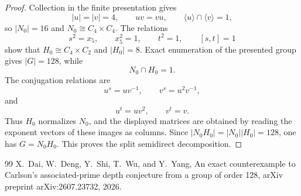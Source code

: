 \documentclass[10pt,a4paper]{amsart}
\begin{document}
\begin{proof}
Collection in the finite presentation gives
\[
|u|=|v|=4,
\qquad uv=vu,
\qquad \langle u\rangle\cap\langle v\rangle=1,
\]
so \(|N_0|=16\) and \(N_0\cong C_4\times C_4\).  The relations
\[
s^2=x_5,\qquad x_5^2=1,
\qquad t^2=1,
\qquad [s,t]=1
\]
show that \(H_0\cong C_4\times C_2\) and \(|H_0|=8\).  Exact enumeration of the presented group gives \(|G|=128\), while
\[
N_0\cap H_0=1.
\]
The conjugation relations are
\[
u^s=uv^{-1},\qquad v^s=u^2v^{-1},
\]
and
\[
u^t=uv^2,\qquad v^t=v.
\]
Thus \(H_0\) normalizes \(N_0\), and the displayed matrices are obtained by reading the exponent vectors of these images as columns.  Since
\(|N_0H_0|=|N_0||H_0|=128\), one has \(G=N_0H_0\).  This proves the split semidirect decomposition.
\end{proof}


\begin{thebibliography}{99}
 X.~Dai, W.~Deng, Y.~Shi, T.~Wu, and Y.~Yang, An exact counterexample to Carlson's associated-prime depth conjecture from a group of order 128, arXiv preprint arXiv:2607.23732, 2026.
\end{thebibliography}
\end{document}
